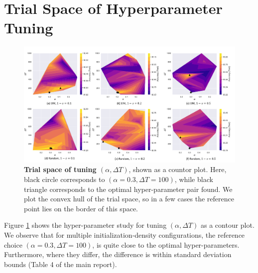 \section{Trial Space of Hyperparameter Tuning}

\begin{figure}[!h]
    \centering
    \includegraphics[width=\textwidth]{../openreview/supplementary_sections/alpha_delta_contour.pdf}
    \captionsetup{aboveskip=\figureaboveskip,belowskip=\figurebelowskip}
    \caption{\textbf{Trial space of tuning $(\alpha, \Delta T)$}, shown as a countor plot. Here, black circle corresponds to $(\alpha=0.3,\Delta T = 100)$, while black triangle corresponds to the optimal hyper-parameter pair found. We plot the convex hull of the trial space, so in a few cases the reference point lies on the border of this space.}
    \label{fig:alpha-deltaT-contour}
\end{figure}

Figure \ref{fig:alpha-deltaT-contour} shows the hyper-parameter study for tuning $(\alpha, \Delta T)$ as a contour plot. We observe that for multiple initialization-density configurations, the reference choice $(\alpha=0.3,\Delta T = 100)$, is quite close to the optimal hyper-parameters. Furthermore, where they differ, the difference is within standard deviation bounds (Table 4 of the main report).